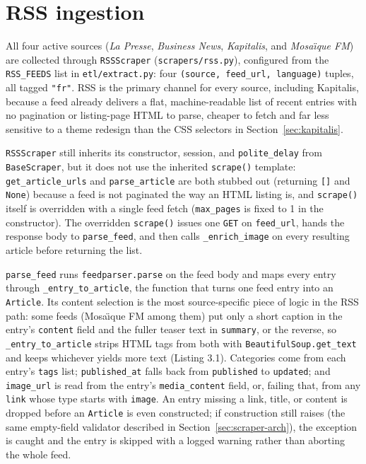 \section{RSS ingestion}
\label{sec:rss}
All four active sources (\textit{La Presse}, \textit{Business News}, \textit{Kapitalis}, and \textit{Mosa\"{\i}que FM}) are collected through \texttt{RSSScraper} (\texttt{scrapers/rss.py}), configured from the \texttt{RSS\_FEEDS} list in \texttt{etl/extract.py}: four \texttt{(source, feed\_url, language)} tuples, all tagged \texttt{"fr"}. RSS is the primary channel for every source, including Kapitalis, because a feed already delivers a flat, machine-readable list of recent entries with no pagination or listing-page HTML to parse, cheaper to fetch and far less sensitive to a theme redesign than the CSS selectors in Section~\ref{sec:kapitalis}.

\texttt{RSSScraper} still inherits its constructor, session, and \texttt{polite\_delay} from \texttt{BaseScraper}, but it does not use the inherited \texttt{scrape()} template: \texttt{get\_article\_urls} and \texttt{parse\_article} are both stubbed out (returning \texttt{[]} and \texttt{None}) because a feed is not paginated the way an HTML listing is, and \texttt{scrape()} itself is overridden with a single feed fetch (\texttt{max\_pages} is fixed to 1 in the constructor). The overridden \texttt{scrape()} issues one \texttt{GET} on \texttt{feed\_url}, hands the response body to \texttt{parse\_feed}, and then calls \texttt{\_enrich\_image} on every resulting article before returning the list.

\texttt{parse\_feed} runs \texttt{feedparser.parse} on the feed body and maps every entry through \texttt{\_entry\_\allowbreak to\_\allowbreak article}, the function that turns one feed entry into an \texttt{Article}. Its content selection is the most source-specific piece of logic in the RSS path: some feeds (Mosa\"{\i}que FM among them) put only a short caption in the entry's \texttt{content} field and the fuller teaser text in \texttt{summary}, or the reverse, so \texttt{\_entry\_to\_article} strips HTML tags from both with \texttt{BeautifulSoup.get\_text} and keeps whichever yields more text (Listing 3.1). Categories come from each entry's \texttt{tags} list; \texttt{published\_at} falls back from \texttt{published} to \texttt{updated}; and \texttt{image\_url} is read from the entry's \texttt{media\_content} field, or, failing that, from any \texttt{link} whose type starts with \texttt{image}. An entry missing a link, title, or content is dropped before an \texttt{Article} is even constructed; if construction still raises (the same empty-field validator described in Section~\ref{sec:scraper-arch}), the exception is caught and the entry is skipped with a logged warning rather than aborting the whole feed.

